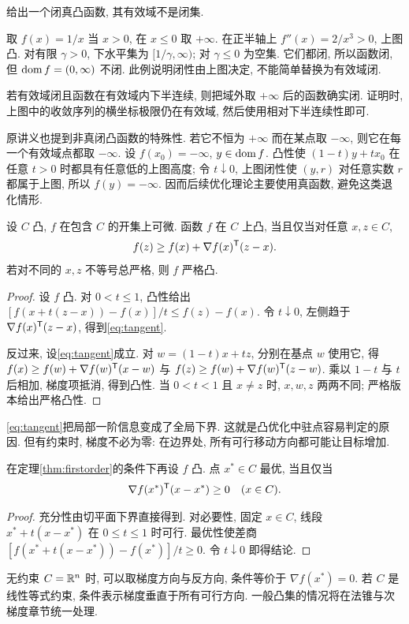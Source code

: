 \begin{example}
给出一个闭真凸函数, 其有效域不是闭集.
\end{example}
\begin{solution}
取 $f(x)=1/x$ 当 $x>0$, 在 $x\le0$ 取 $+\infty$. 在正半轴上 $f''(x)=2/x^3>0$, 上图凸. 对有限 $\gamma>0$, 下水平集为 $[1/\gamma,\infty)$; 对 $\gamma\le0$ 为空集. 它们都闭, 所以函数闭, 但 $\operatorname{dom} f=(0,\infty)$ 不闭. 此例说明闭性由上图决定, 不能简单替换为有效域闭.
\end{solution}
若有效域闭且函数在有效域内下半连续, 则把域外取 $+\infty$ 后的函数确实闭. 证明时, 上图中的收敛序列的横坐标极限仍在有效域, 然后使用相对下半连续性即可.

原讲义也提到非真闭凸函数的特殊性. 若它不恒为 $+\infty$ 而在某点取 $-\infty$, 则它在每一个有效域点都取 $-\infty$. 设 $f(x_0)=-\infty$, $y\in\operatorname{dom} f$. 凸性使 $(1-t)y+tx_0$ 在任意 $t>0$ 时都具有任意低的上图高度; 令 $t\downarrow0$, 上图闭性使 $(y,r)$ 对任意实数 $r$ 都属于上图, 所以 $f(y)=-\infty$. 因而后续优化理论主要使用真函数, 避免这类退化情形.

\begin{theorem}\label{thm:firstorder}
设 $C$ 凸, $f$ 在包含 $C$ 的开集上可微. 函数 $f$ 在 $C$ 上凸, 当且仅当对任意 $x,z\in C$,
\begin{equation}\label{eq:tangent}
f(z)\ge f(x)+\nabla f(x)^{\mathsf T}(z-x).
\end{equation}
若对不同的 $x,z$ 不等号总严格, 则 $f$ 严格凸.
\end{theorem}
\begin{proof}
设 $f$ 凸. 对 $0<t\le1$, 凸性给出
$[f(x+t(z-x))-f(x)]/t\le f(z)-f(x)$. 令 $t\downarrow0$, 左侧趋于 $\nabla f(x)^{\mathsf T}(z-x)$, 得到\eqref{eq:tangent}.

反过来, 设\eqref{eq:tangent}成立. 对 $w=(1-t)x+tz$, 分别在基点 $w$ 使用它, 得
$f(x)\ge f(w)+\nabla f(w)^{\mathsf T}(x-w)$ 与 $f(z)\ge f(w)+\nabla f(w)^{\mathsf T}(z-w)$. 乘以 $1-t$ 与 $t$ 后相加, 梯度项抵消, 得到凸性. 当 $0<t<1$ 且 $x\ne z$ 时, $x,w,z$ 两两不同; 严格版本给出严格凸性.
\end{proof}
\eqref{eq:tangent}把局部一阶信息变成了全局下界. 这就是凸优化中驻点容易判定的原因. 但有约束时, 梯度不必为零: 在边界处, 所有可行移动方向都可能让目标增加.

\begin{theorem}\label{thm:vi}
在定理\ref{thm:firstorder}的条件下再设 $f$ 凸. 点 $x^*\in C$ 最优, 当且仅当
\[
\nabla f(x^*)^{\mathsf T}(x-x^*)\ge0\quad(x\in C).
\]
\end{theorem}
\begin{proof}
充分性由切平面下界直接得到. 对必要性, 固定 $x\in C$, 线段 $x^*+t(x-x^*)$ 在 $0\le t\le1$ 时可行. 最优性使差商 $[f(x^*+t(x-x^*))-f(x^*)]/t\ge0$. 令 $t\downarrow0$ 即得结论.
\end{proof}
无约束 $C=\mathbb R^n$ 时, 可以取梯度方向与反方向, 条件等价于 $\nabla f(x^*)=0$. 若 $C$ 是线性等式约束, 条件表示梯度垂直于所有可行方向. 一般凸集的情况将在法锥与次梯度章节统一处理.

